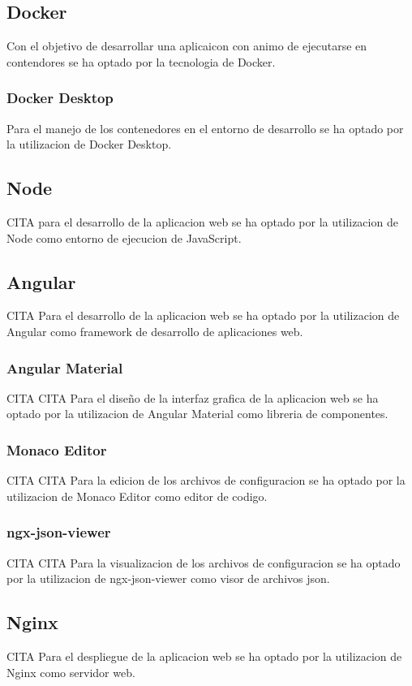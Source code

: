 \documentclass[12pt, a4paper, twoside]{article}
\begin{document}
\subsection{Docker}
Con el objetivo de desarrollar una aplicaicon con animo de ejecutarse en contendores se ha optado por la tecnologia de Docker.
\subsubsection{Docker Desktop}
Para el manejo de los contenedores en el entorno de desarrollo se ha optado por la utilizacion de Docker Desktop.

\subsection{Node}
CITA
para el desarrollo de la aplicacion web se ha optado por la utilizacion de Node como entorno de ejecucion de JavaScript.
\subsection{Angular}
CITA
Para el desarrollo de la aplicacion web se ha optado por la utilizacion de Angular como framework de desarrollo de aplicaciones web.
\subsubsection{Angular Material}
CITA
CITA Para el diseño de la interfaz grafica de la aplicacion web se ha optado por la utilizacion de Angular Material como libreria de componentes.
\subsubsection{Monaco Editor}
CITA
CITA Para la edicion de los archivos de configuracion se ha optado por la utilizacion de Monaco Editor como editor de codigo.
\subsubsection{ngx-json-viewer}
CITA
CITA Para la visualizacion de los archivos de configuracion se ha optado por la utilizacion de ngx-json-viewer como visor de archivos json.

\subsection{Nginx}
CITA
Para el despliegue de la aplicacion web se ha optado por la utilizacion de Nginx como servidor web.
\end{document}
